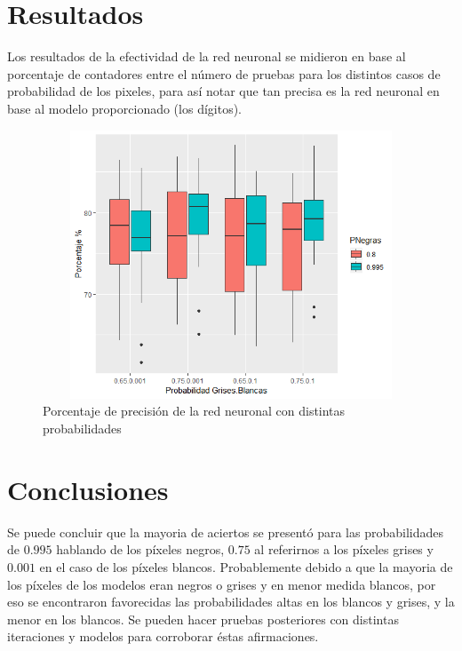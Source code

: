 \documentclass{article}
\begin{document}


\section{Resultados}
Los resultados de la efectividad de la red neuronal se midieron en base al porcentaje de contadores entre el número de pruebas para los distintos casos de probabilidad de los pixeles, para así notar que tan precisa es la red neuronal en base al modelo proporcionado (los dígitos).

\begin{figure}[!ht]
\centering
\includegraphics[width=17cm, height=8cm]{P12gt.png}
\caption{Porcentaje de precisión de la red neuronal con distintas probabilidades}
\end{figure}


\section{Conclusiones}
Se puede concluir que la mayoria de aciertos se presentó para las probabilidades de $0.995$ hablando de los píxeles negros, $0.75$ al referirnos a los píxeles grises y $0.001$ en el caso de los píxeles blancos. Probablemente debido a que la mayoria de los píxeles de los modelos eran negros o grises y en menor medida blancos, por eso se encontraron favorecidas las probabilidades altas en los blancos y grises, y la menor en los blancos. Se pueden hacer pruebas posteriores con distintas iteraciones y modelos para corroborar éstas afirmaciones.



\end{document}
